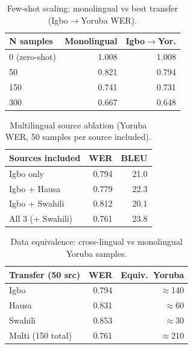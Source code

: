 
\begin{table}[t]
\centering
\small
\caption{Few-shot scaling: monolingual vs best transfer (Igbo$\to$Yoruba WER).}
\label{tab:p5_scaling}
\begin{tabular}{lrr}
\toprule
\textbf{N samples} & \textbf{Monolingual} & \textbf{Igbo$\to$Yor.} \\
\midrule
0 (zero-shot) & 1.008 & 1.008 \\
50  & 0.821 & 0.794 \\
150 & 0.741 & 0.731 \\
300 & 0.667 & 0.648 \\
\bottomrule
\end{tabular}
\end{table}

\begin{table}[t]
\centering
\small
\caption{Multilingual source ablation (Yoruba WER, 50 samples per source included).}
\label{tab:p5_multilingual}
\begin{tabular}{lrr}
\toprule
\textbf{Sources included} & \textbf{WER} & \textbf{BLEU} \\
\midrule
Igbo only           & 0.794 & 21.0 \\
Igbo + Hausa        & 0.779 & 22.3 \\
Igbo + Swahili      & 0.812 & 20.1 \\
All 3 (+ Swahili)   & 0.761 & 23.8 \\
\bottomrule
\end{tabular}
\end{table}

\begin{table}[t]
\centering
\small
\caption{Data equivalence: cross-lingual vs monolingual Yoruba samples.}
\label{tab:p5_equiv}
\begin{tabular}{lrr}
\toprule
\textbf{Transfer (50 src)} & \textbf{WER} & \textbf{Equiv.\ Yoruba} \\
\midrule
Igbo    & 0.794 & $\approx$140 \\
Hausa   & 0.831 & $\approx$60 \\
Swahili & 0.853 & $\approx$30 \\
Multi (150 total) & 0.761 & $\approx$210 \\
\bottomrule
\end{tabular}
\end{table}
